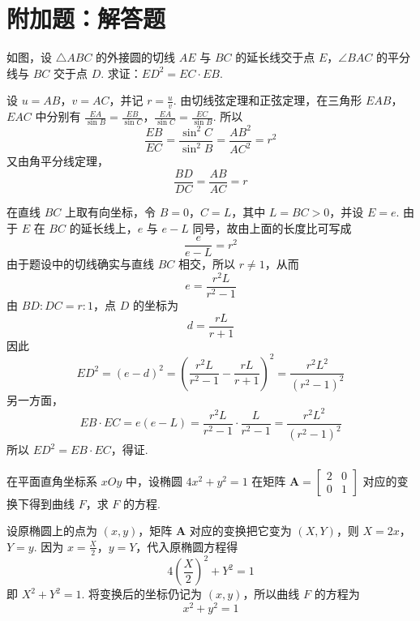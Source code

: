 \section{附加题：解答题}

\begin{problem}[A]
如图，设 \(\triangle ABC\) 的外接圆的切线 \(AE\) 与 \(BC\) 的延长线交于点 \(E\)，\(\angle BAC\) 的平分线与 \(BC\) 交于点 \(D\). 求证：\(ED^2 = EC \cdot EB\).

\end{problem}

\begin{solution}
设 \(u=AB\)，\(v=AC\)，并记 \(r=\frac{u}{v}\). 由切线弦定理和正弦定理，在三角形 \(EAB\)，\(EAC\) 中分别有
\(\frac{EA}{\sin B}=\frac{EB}{\sin C}\)，\(\frac{EA}{\sin C}=\frac{EC}{\sin B}\).
所以
\[
\frac{EB}{EC}=\frac{\sin^2C}{\sin^2B}=\frac{AB^2}{AC^2}=r^2
\]
又由角平分线定理，
\[
\frac{BD}{DC}=\frac{AB}{AC}=r
\]

在直线 \(BC\) 上取有向坐标，令 \(B=0\)，\(C=L\)，其中 \(L=BC>0\)，并设 \(E=e\). 由于 \(E\) 在 \(BC\) 的延长线上，\(e\) 与 \(e-L\) 同号，故由上面的长度比可写成
\[
\frac{e}{e-L}=r^2
\]
由于题设中的切线确实与直线 \(BC\) 相交，所以 \(r\neq1\)，从而
\[
e=\frac{r^2L}{r^2-1}
\]
由 \(BD:DC=r:1\)，点 \(D\) 的坐标为
\[
d=\frac{rL}{r+1}
\]
因此
\[
ED^2=(e-d)^2=\left(\frac{r^2L}{r^2-1}-\frac{rL}{r+1}\right)^2=\frac{r^2L^2}{(r^2-1)^2}
\]
另一方面，
\[
EB\cdot EC=e(e-L)=\frac{r^2L}{r^2-1}\cdot\frac{L}{r^2-1}=\frac{r^2L^2}{(r^2-1)^2}
\]
所以 \(ED^2=EB\cdot EC\)，得证.
\end{solution}

\reuseproblemnumber
\begin{problem}[B]
在平面直角坐标系 \(xOy\) 中，设椭圆 \(4x^{2} + y^{2} = 1\) 在矩阵 \(\mathbf{A} = \begin{bmatrix} 2 & 0 \\ 0 & 1 \end{bmatrix}\) 对应的变换下得到曲线 \(F\)，求 \(F\) 的方程.
\end{problem}

\begin{solution}
设原椭圆上的点为 \((x,y)\)，矩阵 \(\mathbf A\) 对应的变换把它变为 \((X,Y)\)，则
\(X=2x\)，\(Y=y\).
因为 \(x=\frac{X}{2}\)，\(y=Y\)，代入原椭圆方程得
\[
4\left(\frac{X}{2}\right)^2+Y^2=1
\]
即 \(X^2+Y^2=1\). 将变换后的坐标仍记为 \((x,y)\)，所以曲线 \(F\) 的方程为
\[
x^2+y^2=1
\]
\end{solution}

